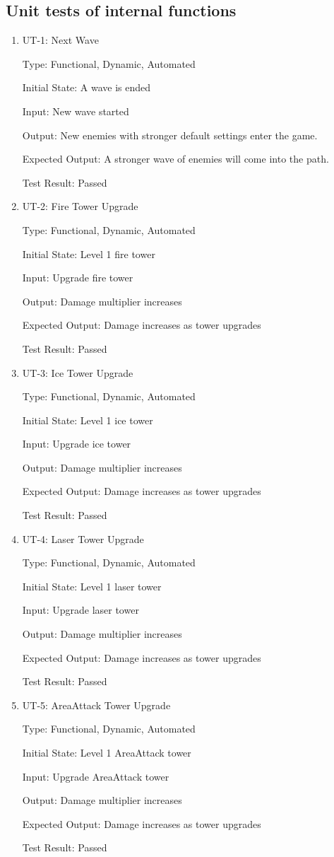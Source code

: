 \documentclass[12pt]{article}
\begin{document}
	\subsection{Unit tests of internal functions}
	\begin{enumerate}
	\item{UT-1: Next Wave}
	
	Type: Functional, Dynamic, Automated
	
	Initial State: A wave is ended
	
	Input: New wave started
	
	Output: New enemies with stronger default settings enter the game.
	
	Expected Output: A stronger wave of enemies will come into the path.
	
	Test Result: Passed
	
	\item{UT-2: Fire Tower Upgrade}
	
	Type: Functional, Dynamic, Automated
	
	Initial State: Level 1 fire tower
	
	Input: Upgrade fire tower
	
	Output: Damage multiplier increases
	
	Expected Output: Damage increases as tower upgrades
	
	Test Result: Passed
	
	\item{UT-3: Ice Tower Upgrade}
	
	Type: Functional, Dynamic, Automated
	
	Initial State: Level 1 ice tower
	
	Input: Upgrade ice tower
	
	Output: Damage multiplier increases
	
	Expected Output: Damage increases as tower upgrades
	
	Test Result: Passed
	
	\item{UT-4: Laser Tower Upgrade}
	
	Type: Functional, Dynamic, Automated
	
	Initial State: Level 1 laser tower
	
	Input: Upgrade laser tower
	
	Output: Damage multiplier increases
	
	Expected Output: Damage increases as tower upgrades
	
	Test Result: Passed
	
	\item{UT-5: AreaAttack Tower Upgrade}
	
	Type: Functional, Dynamic, Automated
	
	Initial State: Level 1 AreaAttack tower
	
	Input: Upgrade AreaAttack tower
	
	Output: Damage multiplier increases
	
	Expected Output: Damage increases as tower upgrades
	
	Test Result: Passed
	\end{enumerate}
	
\end{document}
